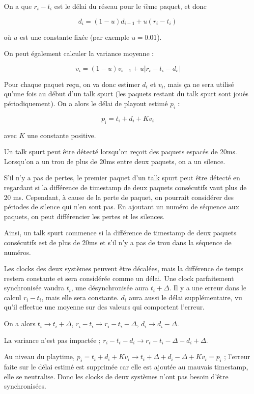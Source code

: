 \documentclass[10pt,a4paper]{report}
\begin{document}
			On a que $r_i - t_i$ est le délai du réseau pour le $i$ème paquet, et donc 
			
			$$d_i = (1 - u) d_{i - 1} + u(r_i - t_i)$$
			
			où $u$ est une constante fixée (par exemple $u = 0.01$).
			
			On peut également calculer la variance moyenne :
			
			$$v_i = (1 - u) v_{i - 1} + u \vert r_i - t_i - d_i\vert$$
			
			Pour chaque paquet reçu, on va donc estimer $d_i$ et $v_i$, mais ça ne sera utilisé qu'une fois au début d'un talk spurt (les paquets restant du talk spurt sont joués périodiquement). On a alors le délai de playout estimé $p_i$ :
			
			$$p_i = t_i + d_i + K v_i$$
		
			avec $K$ une constante positive.
		
			Un talk spurt peut être détecté lorsqu'on reçoit des paquets espacés de 20ms. Lorsqu'on a un trou de plus de 20ms entre deux paquets, on a un silence. 
			
			S'il n'y a pas de pertes, le premier paquet d'un talk spurt peut être détecté en regardant si la différence de timestamp de deux paquets consécutifs vaut plus de 20 ms.	Cependant, à cause de la perte de paquet, on pourrait considérer des périodes de silence qui n'en sont pas. En ajoutant un numéro de séquence aux paquets, on peut différencier les pertes et les silences.
			
			Ainsi, un talk spurt commence si la différence de timestamp de deux paquets consécutifs est de plus de 20ms et s'il n'y a pas de trou dans la séquence de numéros.
		
			Les clocks des deux systèmes peuvent être décalées, mais la différence de temps restera constante et sera considérée comme un délai. Une clock parfaitement synchronisée vaudra $t_i$, une désynchronisée aura $t_i + \Delta$. Il y a une erreur dans le calcul $r_i - t_i$, mais elle sera constante. $d_i$ aura aussi le délai supplémentaire, vu qu'il effectue une moyenne sur des valeurs qui comportent l'erreur.
		
			On a alors $t_i \rightarrow t_i + \Delta$, $r_i - t_i \rightarrow r_i - t_i - \Delta$, $d_i \rightarrow d_i - \Delta$.
		
			La variance n'est pas impactée ; $r_i - t_i - d_i \rightarrow r_i - t_i - \Delta - d_i + \Delta$.
		
			Au niveau du playtime, $p_i = t_i + d_i + K v_i \rightarrow t_i + \Delta + d_i - \Delta + K v_i = p_i$ ; l'erreur faite sur le délai estimé est supprimée car elle est ajoutée au mauvais timestamp, elle se neutralise. Donc les clocks de deux systèmes n'ont pas besoin d'être synchronisées.
	
\end{document}
